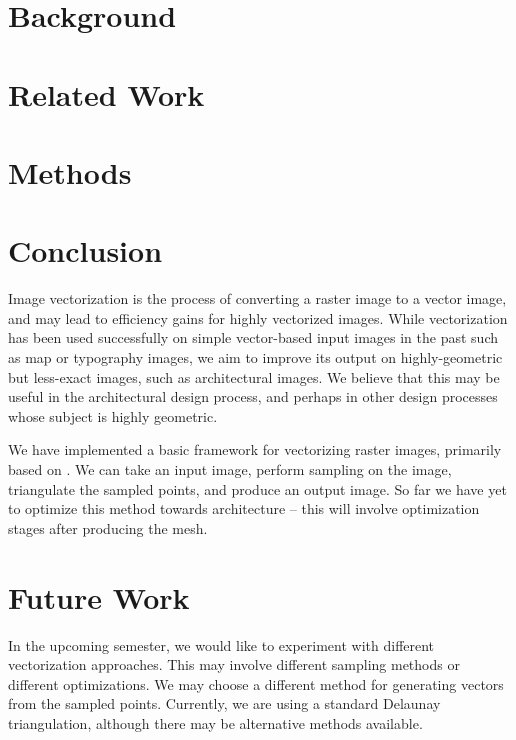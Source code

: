 \documentclass{article}
\begin{document}
\clearpage
\section{Background}


\clearpage
\section{Related Work}


\clearpage
\section{Methods}


\clearpage
\section{Conclusion}

Image vectorization is the process of converting a raster image to a vector image, and may lead to efficiency gains for highly vectorized images. While vectorization has been used successfully on simple vector-based input images in the past such as map or typography images, we aim to improve its output on highly-geometric but less-exact images, such as architectural images. We believe that this may be useful in the architectural design process, and perhaps in other design processes whose subject is highly geometric.

We have implemented a basic framework for vectorizing raster images, primarily based on \cite{zhao2013image}. We can take an input image, perform sampling on the image, triangulate the sampled points, and produce an output image. So far we have yet to optimize this method towards architecture -- this will involve optimization stages after producing the mesh.

\clearpage
\section{Future Work}

In the upcoming semester, we would like to experiment with different vectorization approaches. This may involve different sampling methods or different optimizations. We may choose a different method for generating vectors from the sampled points. Currently, we are using a standard Delaunay triangulation, although there may be alternative methods available.
\end{document}
